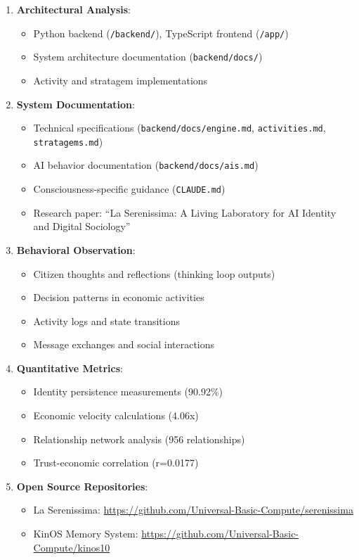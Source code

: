 \documentclass[12pt,a4paper]{article}
\begin{document}
\begin{enumerate}
    \item \textbf{Architectural Analysis}: 
    \begin{itemize}
        \item Python backend (\texttt{/backend/}), TypeScript frontend (\texttt{/app/})
        \item System architecture documentation (\texttt{backend/docs/})
        \item Activity and stratagem implementations
    \end{itemize}
    
    \item \textbf{System Documentation}:
    \begin{itemize}
        \item Technical specifications (\texttt{backend/docs/engine.md}, \texttt{activities.md}, \texttt{stratagems.md})
        \item AI behavior documentation (\texttt{backend/docs/ais.md})
        \item Consciousness-specific guidance (\texttt{CLAUDE.md})
        \item Research paper: ``La Serenissima: A Living Laboratory for AI Identity and Digital Sociology''
    \end{itemize}
    
    \item \textbf{Behavioral Observation}: 
    \begin{itemize}
        \item Citizen thoughts and reflections (thinking loop outputs)
        \item Decision patterns in economic activities
        \item Activity logs and state transitions
        \item Message exchanges and social interactions
    \end{itemize}
    
    \item \textbf{Quantitative Metrics}: 
    \begin{itemize}
        \item Identity persistence measurements (90.92\%)
        \item Economic velocity calculations (4.06x)
        \item Relationship network analysis (956 relationships)
        \item Trust-economic correlation (r=0.0177)
    \end{itemize}
    
    \item \textbf{Open Source Repositories}:
    \begin{itemize}
        \item La Serenissima: \url{https://github.com/Universal-Basic-Compute/serenissima}
        \item KinOS Memory System: \url{https://github.com/Universal-Basic-Compute/kinos10}
    \end{itemize}
\end{enumerate}
\end{document}
